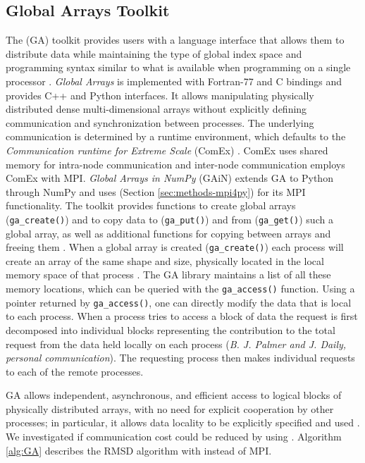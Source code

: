 \subsection{Global Arrays Toolkit}
\label{sec:methods-ga}

The  (GA) toolkit provides users with a language interface that allows them to distribute data while maintaining the type of global index space and programming syntax similar to what is available when programming on a single processor \cite{GA}.
\emph{Global Arrays} is implemented with Fortran-77 and C bindings and provides C++ and Python interfaces.
It allows manipulating physically distributed dense multi-dimensional arrays without explicitly defining communication and synchronization between processes.
The underlying communication is determined by a runtime environment, which defaults to the \emph{Communication runtime for Extreme Scale} (ComEx) \cite{Daily:2014aa}.
ComEx uses shared memory for intra-node communication and inter-node communication employs ComEx with MPI.
\emph{Global Arrays in NumPy} (GAiN) extends GA to Python through NumPy \cite{GAiN} and uses  (Section \ref{sec:methods-mpi4py}) for its MPI functionality.
The  toolkit provides functions to create global arrays (\texttt{ga\_create()}) and to copy data to (\texttt{ga\_put()}) and from (\texttt{ga\_get()}) such a global array,  as well as additional functions for copying between arrays and freeing them \cite{GAiN}.
When a global array is created (\texttt{ga\_create()}) each process will create an array of the same shape and size, physically located in the local memory space of that process \cite{GA}. 
The GA library maintains a list of all these memory locations, which can be queried with the \texttt{ga\_access()} function.
Using a pointer returned by \texttt{ga\_access()}, one can directly modify the data that is local to each process.
When a process tries to access a block of data the request is first decomposed into individual blocks representing the contribution to the total request from the data held locally on each process (\textit{B. J. Palmer and J. Daily, personal communication}).
The requesting process then makes individual requests to each of the remote processes. 

GA allows independent, asynchronous, and efficient access to logical blocks of physically distributed arrays, with no need for explicit cooperation by other processes; in particular, it allows data locality to be explicitly specified and used \cite{GA-NUMA}.
We investigated if communication cost could be reduced by using .
Algorithm \ref{alg:GA} describes the RMSD algorithm with  instead of MPI.



